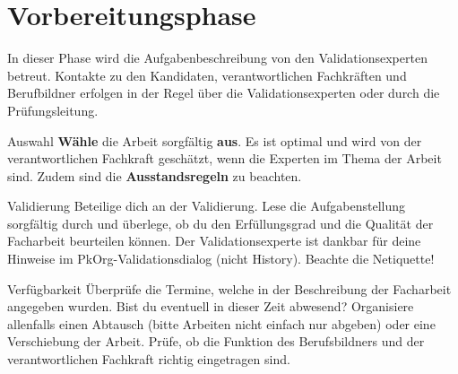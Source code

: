 \chapter{Vorbereitungsphase}
In dieser Phase wird die Aufgabenbeschreibung von den Validationsexperten betreut. Kontakte zu den Kandidaten, verantwortlichen Fachkräften und Berufbildner erfolgen in der Regel über die Validationsexperten oder durch die Prüfungsleitung.

\begin{taskitemwithoutcomment}{Auswahl}
  \textbf{Wähle} die Arbeit sorgfältig \textbf{aus}. Es ist optimal und wird von der verantwortlichen Fachkraft geschätzt, wenn die Experten im Thema der Arbeit sind. Zudem sind die \textbf{Ausstandsregeln} zu beachten.
\end{taskitemwithoutcomment}
\begin{taskitem}{Validierung}
  Beteilige dich an der Validierung. Lese die Aufgabenstellung sorgfältig durch und überlege, ob du den Erfüllungsgrad und die Qualität der Facharbeit beurteilen können. Der Validationsexperte ist dankbar für deine Hinweise im PkOrg-Validationsdialog (nicht History). Beachte die Netiquette!
\end{taskitem}
\begin{taskitem}{Verfügbarkeit}
  Überprüfe die Termine, welche in der Beschreibung der Facharbeit angegeben wurden. Bist du eventuell in dieser Zeit abwesend? Organisiere allenfalls einen Abtausch (bitte Arbeiten nicht einfach nur abgeben) oder eine Verschiebung der Arbeit. Prüfe, ob die Funktion des Berufsbildners und der verantwortlichen Fachkraft richtig eingetragen sind.
\end{taskitem}